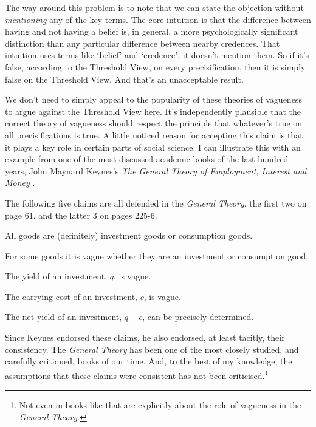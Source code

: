 The way around this problem is to note that we can state the objection without \textit{mentioning} any of the key terms. The core intuition is that the difference between having and not having a belief is, in general, a more psychologically significant distinction than any particular difference between nearby credences. That intuition uses terms like `belief' and `credence', it doesn't mention them. So if it's false, according to the Threshold View, on every precisification, then it is simply false on the Threshold View. And that's an unacceptable result.

We don't need to simply appeal to the popularity of these theories of vagueness to argue against the Threshold View here. It's independently plausible that the correct theory of vagueness should respect the principle that whatever's true on all precisifications is true. A little noticed reason for accepting this claim is that it plays a key role in certain parts of social science. I can illustrate this with an example from one of the most discussed academic books of the last hundred years, John Maynard Keynes's \textit{The General Theory of Employment, Interest and Money} \cite{Keynes1936}. 

The following five claims are all defended in the \textit{General Theory}, the first two on page 61, and the latter 3 on pages 225-6.

\begin{enumerate*}
\renewcommand{\labelenumi}{(\arabic{enumi})}
\item All goods are (definitely) investment goods or consumption goods.
\item For some goods it is vague whether they are an investment or consumption good. 
\item The yield of an investment, \(q\), is vague.
\item The carrying cost of an investment, \(c\), is vague.
\item The net yield of an investment, \(q - c\), can be precisely determined. 
\end{enumerate*}

\noindent Since Keynes endorsed these claims, he also endorsed, at least tacitly, their consistency. The \textit{General Theory} has been one of the most closely studied, and carefully critiqued, books of our time. And, to the best of my knowledge, the assumptions that these claims were consistent has not been criticised.\footnote{Not even in books like \cite{Coates1996} that are explicitly about the role of vagueness in the \textit{General Theory}.} 

